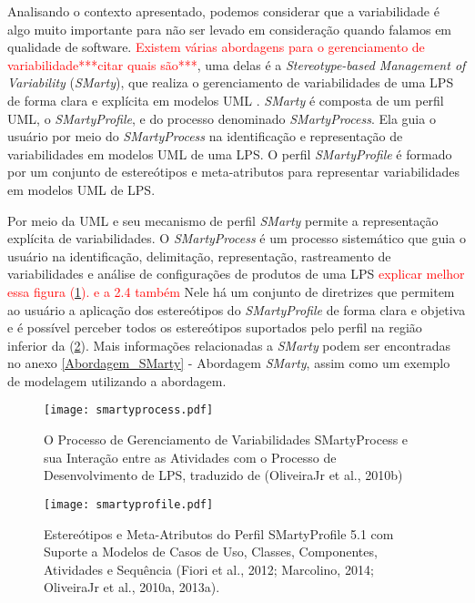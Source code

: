 Analisando o contexto apresentado, podemos considerar que a variabilidade é algo muito importante para não ser levado em consideração quando falamos em qualidade de software. \textcolor{red}{Existem várias abordagens para o gerenciamento de variabilidade***citar quais são***}, uma delas é a \textit{Stereotype-based Management of Variability} (\textit{SMarty}), que realiza o gerenciamento de variabilidades de uma LPS de forma clara e explícita em modelos UML \cite{junior2010systematic}. \textit{SMarty} é composta de um perfil UML, o \textit{SMartyProfile}, e do processo denominado \textit{SMartyProcess}. Ela guia o usuário por meio do \textit{SMartyProcess} na identificação e representação de variabilidades em modelos UML de uma LPS. O perfil \textit{SMartyProfile} é formado por um conjunto de estereótipos e meta-atributos para representar variabilidades em modelos UML de LPS.

Por meio da UML e seu mecanismo de perfil \textit{SMarty} permite a representação explícita de variabilidades. O \textit{SMartyProcess} é um processo sistemático que guia o usuário na identificação, delimitação, representação, rastreamento de variabilidades e análise de configurações de produtos de uma LPS \textcolor{red}{explicar melhor essa figura (\ref{fig:smartyprocess}). e a 2.4 também} Nele há um conjunto de diretrizes que permitem ao usuário a aplicação dos estereótipos do \textit{SMartyProfile} de forma clara e objetiva e é possível perceber todos os estereótipos suportados pelo perfil na região inferior da (\ref{fig:smartyprofile}). Mais informações relacionadas a \textit{SMarty} podem ser encontradas no anexo \ref{Abordagem_SMarty} - Abordagem \textit{SMarty}, assim como um exemplo de modelagem utilizando a abordagem.

\begin{figure}[htb]
	\centering
	\texttt{[image: smartyprocess.pdf]}
	\caption{ O Processo de Gerenciamento de Variabilidades SMartyProcess e sua Interação entre as Atividades com o Processo de Desenvolvimento de LPS, traduzido de (OliveiraJr et al., 2010b)}
	\label{fig:smartyprocess}
\end{figure}


\begin{landscape}
	
	\begin{figure}[htb]
		\centering
		\texttt{[image: smartyprofile.pdf]}
		\caption{ Estereótipos e Meta-Atributos do Perfil SMartyProfile 5.1 com Suporte a Modelos de Casos de Uso, Classes, Componentes, Atividades e Sequência (Fiori et al., 2012; Marcolino, 2014; OliveiraJr et al., 2010a, 2013a). }
		\label{fig:smartyprofile}
	\end{figure}
	
	
\end{landscape}

